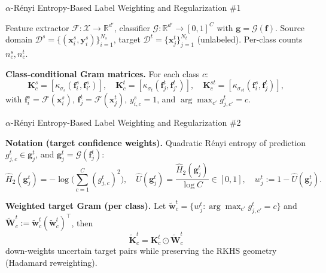 \documentclass[aspectratio=169]{beamer}
\begin{document}
\begin{frame}{$\alpha$-Rényi Entropy-Based Label Weighting and Regularization \#1}

Feature extractor $\mathcal{F}:\mathcal{X}\to\mathbb{R}^{d'}$,
classifier $\mathcal{G}:\mathbb{R}^{d'}\to[0,1]^C$ with $\mathbf{g}=\mathcal{G}(\mathbf{f})$.
Source domain $\mathcal{D}^s=\{(\mathbf{x}_i^s,\mathbf{y}_i^s)\}_{i=1}^{N_s}$,
target $\mathcal{D}^t=\{\mathbf{x}_j^t\}_{j=1}^{N_t}$ (unlabeled).
Per-class counts $n_c^s,n_c^t$.

\medskip
\textbf{Class-conditional Gram matrices.}
For each class $c$:
\[
\mathbf{K}_c^s=[\kappa_{\sigma_s}(\mathbf{f}_i^s,\mathbf{f}_{i'}^s)],\quad
\mathbf{K}_c^t=[\kappa_{\sigma_t}(\mathbf{f}_j^t,\mathbf{f}_{j'}^t)],\quad
\mathbf{K}_c^{st}=[\kappa_{\sigma_{st}}(\mathbf{f}_i^s,\mathbf{f}_j^t)],
\]
with $\mathbf{f}_i^s=\mathcal{F}(\mathbf{x}_i^s)$, $\mathbf{f}_j^t=\mathcal{F}(\mathbf{x}_j^t)$,
$y^s_{i,c}=1$, and $\arg\max_{c'} g^t_{j,c'}=c$.

\end{frame}

\begin{frame}{$\alpha$-Rényi Entropy-Based Label Weighting and Regularization \#2}

\textbf{Notation (target confidence weights).}
Quadratic Rényi entropy of prediction $g^t_{j,c}\in \mathbf{g}^t_j$, and $\mathbf{g}^t_j=\mathcal{G}(\mathbf{f}_{j}^t)$:
\[
\hat H_2(\mathbf{g}_j^t)=-\log\!\Big(\sum_{c=1}^{C}(g^t_{j,c})^{2}\Big),\quad
\hat U(\mathbf{g}_j^t)=\frac{\hat H_2(\mathbf{g}_j^t)}{\log C}\in[0,1],\quad
w_j^t:=1-\hat U(\mathbf{g}_j^t).
\]

\medskip
\textbf{Weighted target Gram (per class).}
Let $\tilde{\mathbf{w}}_c^t=\{w_j^t:\arg\max_{c'} g^t_{j,c'}=c\}$ and
$\tilde{\mathbf{W}}_c^t:=\tilde{\mathbf{w}}_c^t(\tilde{\mathbf{w}}_c^t)^\top$,
then
\[
\boxed{\;\tilde{\mathbf{K}}_c^t=\mathbf{K}_c^t\odot \tilde{\mathbf{W}}_c^t\;}
\]
down-weights uncertain target pairs while preserving the RKHS geometry (Hadamard reweighting).

\end{frame}
\end{document}
